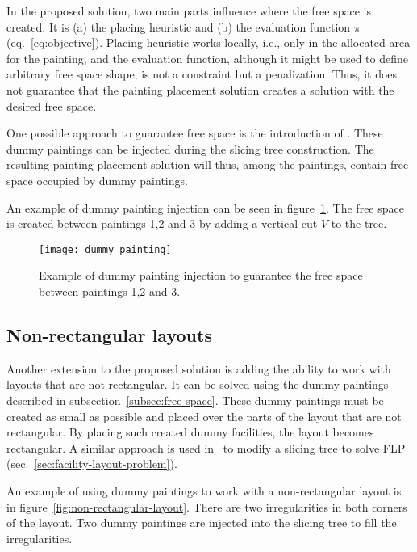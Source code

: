 In the proposed solution, two main parts influence where the free space is created.
It is (a) the placing heuristic and (b) the evaluation function $\pi$ (eq.~\ref{eq:objective}).
Placing heuristic works locally, i.e., only in the allocated area for the painting, and the evaluation
function, although it might be used to define arbitrary free space shape, is not a constraint but a penalization.
Thus, it does not guarantee that the painting placement solution creates a solution with the desired free space.

One possible approach to guarantee free space is the introduction of .
These dummy paintings can be injected during the slicing tree construction.
The resulting painting placement solution will thus, among the paintings, contain free space occupied by dummy paintings.

An example of dummy painting injection can be seen in figure~\ref{fig:dummy-painting}.
The free space is created between paintings 1,2 and 3 by adding a vertical cut $V$ to the tree.


\begin{figure}[h!]
    \texttt{[image: dummy\_painting]}
    \caption[Example of dummy painting injection]{Example of dummy painting injection to guarantee the free space between paintings 1,2 and 3.}
    \label{fig:dummy-painting}
\end{figure}

\subsection{Non-rectangular layouts}\label{subsec:non-rectangular-layouts}

Another extension to the proposed solution is adding the ability to work with layouts that are not rectangular.
It can be solved using the dummy paintings described in subsection~\ref{subsec:free-space}.
These dummy paintings must be created as small as possible and placed over the parts of the layout that are not rectangular.
By placing such created dummy facilities, the layout becomes rectangular.
A similar approach is used in~\cite{scholzExtensionsSTaTSPractical2010} to modify a slicing tree to solve FLP (sec.~\ref{sec:facility-layout-problem}).

An example of using dummy paintings to work with a non-rectangular layout is in figure~\ref{fig:non-rectangular-layout}.
There are two irregularities in both corners of the layout.
Two dummy paintings are injected into the slicing tree to fill the irregularities.

